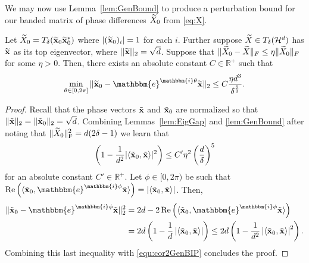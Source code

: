 We may now use Lemma~\ref{lem:GenBound} to produce a perturbation bound for our banded matrix of phase differences $\widetilde{X}_0$ from \eqref{eq:X}.

\begin{theorem}\label{cor2:GenBound}
Let $\widetilde{X}_0 = T_{\delta}(\widetilde{\mathbf x}_0 \widetilde{\mathbf x}_0^*)$ where $|(\widetilde{\mathbf x}_0)_i| = 1$ for each $i$.  Further suppose $\widetilde{X} \in T_{\delta}(\mathcal{H}^d)$ has $\widetilde{\mathbf x}$ as its top eigenvector, where $||\widetilde{\mathbf x}||_2 = \sqrt{d}$.  Suppose that $\Vert \widetilde{X}_0 - \widetilde{X} \Vert_F \le \eta \Vert \widetilde{X}_0 \Vert_F$ for some $\eta>0$.  Then, there exists an absolute constant $C \in \mathbb{R}^+$ such that
\[\min_{\theta\in[0,2\pi]} \Vert \tx_0 - \mathbbm{e}^{\mathbbm{i}\theta} \tx \Vert_2 \le C\bigfrac{\eta d^3}{\delta^{\frac{5}{2}}}.\]
\end{theorem}

\begin{proof}
Recall that the phase vectors $\tilde{\mathbf x}$ and $\tilde{\mathbf x}_0$ are normalized so that $\| \tilde{\mathbf x} \|_2 = \| \tilde{\mathbf x}_0 \|_2 = \sqrt{d}$.  Combining Lemmas~\ref{lem:EigGap} and \ref{lem:GenBound} after noting that $\| \widetilde{X}_0 \|^2_{\rm F} = d (2 \delta - 1)$ we learn that 
\begin{equation}
\left( 1 - \frac{1}{d^2}| \langle \tilde{\mathbf x}_0, \tilde{\mathbf x} \rangle |^2 \right)  \leq  C' \eta^2 \left( \frac{d}{\delta} \right)^5
\label{equ:cor2GenBIP}
\end{equation}
for an absolute constant $C' \in \mathbb{R}^+$.  Let $\phi \in [0,2 \pi)$ be such that $\operatorname{Re}\left( \langle \tilde{\x}_0,\mathbbm{e}^{\mathbbm{i} \phi} \tilde{\x} \rangle \right) = \left| \langle \tilde{\x}_0, \tilde{\x} \rangle \right|$.  Then,
\begin{align*}
\| \tilde{\x}_0 - \mathbbm{e}^{\mathbbm{i} \phi} \tilde{\x} \|^2_2 &= 2d - 2 \operatorname{Re}\left( \langle \tilde{\x}_0,\mathbbm{e}^{\mathbbm{i} \phi} \tilde{\x} \rangle \right) \\
&= 2d \left( 1 - \frac{1}{d} \left| \langle \tilde{\x}_0, \tilde{\x} \rangle \right| \right) \leq 2d \left( 1 - \frac{1}{d^2} \left| \langle \tilde{\x}_0, \tilde{\x} \rangle \right|^2 \right).
\end{align*}
Combining this last inequality with \eqref{equ:cor2GenBIP} concludes the proof.
\end{proof}
